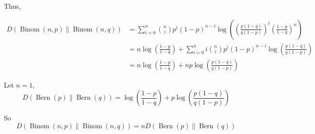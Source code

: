 \documentclass[a4paper]{article}
\begin{document}
\begin{enumerate}
\begin{enumerate}
       Thus,

       \begin{equation}
        \begin{aligned}
          D(\operatorname{Binom}(n, p) \| \operatorname{Binom}(n, q)) &= \sum_{i=0}^n \binom{n}{i}p^i (1-p)^{n-i} \log \left(\left(\frac {p(1-q)}{q(1-p)}\right)^ i \left(\frac {1-p}{1-q}\right)^n\right) \\
          & = n\log \left(\frac {1-p}{1-q}\right) +  \sum_{i=0}^n i\binom{n}{i}p^i (1-p)^{n-i} \log \left(\frac {p(1-q)}{q(1-p)}\right) \\
          & = n\log \left(\frac {1-p}{1-q}\right) + np \log \left(\frac {p(1-q)}{q(1-p)}\right)
        \end{aligned}
      \end{equation}

      Let $n=1$, 
      \begin{equation}
        D(\operatorname{Bern}(p) \| \operatorname{Bern}(q)) = \log \left(\frac {1-p}{1-q}\right) + p \log \left(\frac {p(1-q)}{q(1-p)}\right)
      \end{equation}

      So 
      \begin{equation}
        D(\operatorname{Binom}(n, p) \| \operatorname{Binom}(n, q))=n D(\operatorname{Bern}(p) \| \operatorname{Bern}(q))
      \end{equation}

     \end{enumerate}
    

\end{enumerate}
\end{document}

